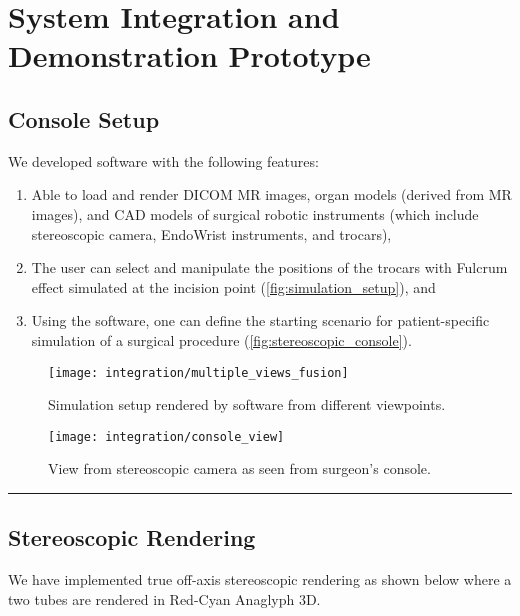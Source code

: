 
\section{System Integration and Demonstration Prototype}\label{sec:system_integration}

\subsection{Console Setup}\label{ssec:console_setup}
We developed software with the following features:
\begin{enumerate}
  \item Able to load and render DICOM MR images, organ models (derived from MR images), and CAD models of surgical robotic instruments (which include stereoscopic camera, EndoWrist instruments, and trocars),
  \item The user can select and manipulate the positions of the trocars with Fulcrum effect simulated at the incision point (\autoref{fig:simulation_setup}), and
  \item Using the software, one can define the starting scenario for patient-specific simulation of a surgical procedure (\autoref{fig:stereoscopic_console}).
\end{enumerate}

\begin{figure}
  \centering%
  \texttt{[image: integration/multiple\_views\_fusion]}
  \caption{Simulation setup rendered by software from different viewpoints.}\label{fig:simulation_setup}
\end{figure}

\begin{figure}
  \centering%
  \texttt{[image: integration/console\_view]}
  \caption{View from stereoscopic camera as seen from surgeon’s console.}\label{fig:stereoscopic_console}
\end{figure}

\hrule%

\subsection{Stereoscopic Rendering}\label{ssec:stereo_rendering}

We have implemented true off-axis stereoscopic rendering as shown below where a two tubes are rendered in Red-Cyan Anaglyph 3D.

